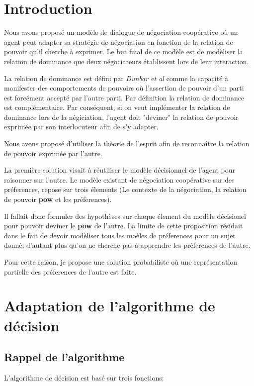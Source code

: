 \documentclass{llncs}
\begin{document}
	
	\section{Introduction}
	Nous avons propos\'e un mod\`ele de dialogue de n\'egociation coop\'erative  o\`u un agent peut adapter sa strat\'egie de n\'egociation en fonction de la relation de pouvoir qu'il cherche \`a exprimer. 
	Le but final de ce mod\`ele est  de mod\`eliser la relation de dominance que deux n\'egociateurs \'etablissent lors de leur interaction. 
	\par La relation de dominance est d\'efini par \emph{Dunbar et \textit{al}} comme la capacit\'e  \`a manifester des comportements de pouvoirs o\`u l'assertion de pouvoir d'un parti est forc\'ement accept\'e par l'autre parti. Par d\'efinition la relation de dominance est compl\'ementaire. 
	Par cons\'equent, si on veut impl\'ementer la relation de dominance lors de la n\'egiciation, l'agent doit "deviner" la relation de pouvoir exprim\'ee par son interlocuteur afin de s'y adapter. 
	
	Nous avons propos\'e d'utiliser la th\`eorie de l'esprit afin de reconna\^itre la relation de pouvoir exprim\'ee par l'autre. 
	
	La premi\`ere solution visait \`a r\'eutiliser le mod\`ele d\'ecisionnel de l'agent pour raisonner sur l'autre. Le mod\`ele existant de n\'egociation coop\'erative sur des pr\'eferences, repose sur trois \'elements (Le contexte de la n\'egociation, la relation de pouvoir \textbf{pow} et les pr\'eferences).
	
	Il fallait donc formuler des hypoth\`eses sur chaque \'element du mod\`ele d\'ecisionel pour pouvoir deviner le \textbf{pow} de l'autre. La limite de cette proposition r\'esidait dans le fait de devoir mod\`eliser tous les mo\`eles de pr\'eferences pour un sujet donn\'e, d'autant plus qu'on ne cherche pas \`a apprendre les pr\'eferences de l'autre.
	
	Pour cette raison, je propose une solution probabiliste où une repr\'esentation partielle des pr\'eferences de l'autre est faite. 
	
	\section{Adaptation de l'algorithme de d\'ecision}
	
	\subsection{Rappel de l'algorithme}
	L'algorithme de d\'ecision est bas\'e sur trois fonctions:
\end{document}
